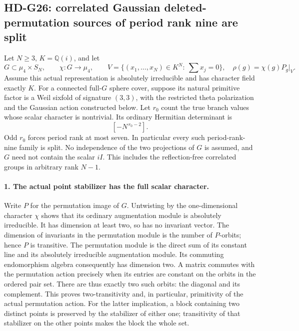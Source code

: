 \subsection{HD-G26: correlated Gaussian deleted-permutation sources of period rank nine are split}
\label{sec:correlated-permutation}

Let \(N\ge3\), \(K=\mathbb Q(i)\), and let
\[
 G\subset\mu_4\times S_N,\qquad
 \chi:G\longrightarrow\mu_4,\qquad
 V=\{(x_1,\ldots,x_N)\in K^N:\ \sum x_j=0\},
 \quad \rho(g)=\chi(g)P_g|_V.                         \tag{G26.1}
\]
Assume this actual representation is absolutely irreducible and
has character field exactly \(K\). For a connected full-\(G\)
sphere cover, suppose its natural primitive factor is a Weil
sixfold of signature \((3,3)\), with the restricted theta
polarization and the Gaussian action constructed below.
Let \(r_0\) count the true branch values whose scalar character
is nontrivial. Its ordinary Hermitian determinant is
\[
                         [-N^{\,r_0-2}].                    \tag{G26.2}
\]
Odd \(r_0\) forces period rank at most seven. In particular
every such period-rank-nine family is split. No independence of
the two projections of \(G\) is assumed, and \(G\) need not
contain the scalar \(iI\). This includes the reflection-free
correlated groups in arbitrary rank \(N-1\).

\paragraph{1. The actual point stabilizer has the full scalar character.}
Write \(P\) for the permutation image of \(G\). Untwisting by
the one-dimensional character \(\chi\) shows that its ordinary
augmentation module is absolutely irreducible. It has dimension
at least two, so has no invariant vector. The dimension of
invariants in the permutation module is the number of \(P\)-orbits;
hence \(P\) is transitive. The permutation module is the direct
sum of its constant line and its absolutely irreducible augmentation
module. Its commuting endomorphism algebra consequently has
dimension two. A matrix commutes with the permutation action
precisely when its entries are constant on the orbits in the
ordered pair set. There are thus exactly two such orbits:
the diagonal and its complement. This proves two-transitivity
and, in particular, primitivity of the actual permutation action.
For the latter implication, a block containing two distinct points
is preserved by the stabilizer of either one; transitivity of
that stabilizer on the other points makes the block the whole set.

